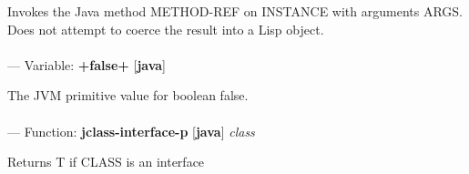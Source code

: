 \begin{adjustwidth}{5em}{5em}
Invokes the Java method METHOD-REF on INSTANCE with arguments ARGS. Does not attempt to coerce the result into a Lisp object.
\end{adjustwidth}

\paragraph{}
\label{JAVA:+FALSE+}
--- Variable: \textbf{+false+} [\textbf{java}] \textit{}

\begin{adjustwidth}{5em}{5em}
The JVM primitive value for boolean false.
\end{adjustwidth}

\paragraph{}
\label{JAVA:JCLASS-INTERFACE-P}
--- Function: \textbf{jclass-interface-p} [\textbf{java}] \textit{class}

\begin{adjustwidth}{5em}{5em}
Returns T if CLASS is an interface
\end{adjustwidth}

